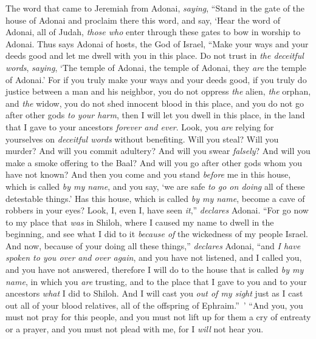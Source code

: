 \begin{biblechapter} %
 The word that came to Jeremiah from Adonai, \textit{saying},
\verse “Stand in the gate of the house of Adonai and proclaim there this word, and say, ‘Hear the word of Adonai, all of Judah, \textit{those who} enter through these gates to bow in worship to Adonai.
\verse Thus says Adonai of hosts, the God of Israel, “Make your ways and your deeds good and let me dwell with you in this place.
\verse Do not trust in \textit{the deceitful words}, \textit{saying}, ‘The temple of Adonai, the temple of Adonai, they \textit{are} the temple of Adonai.’
\verse For if you truly make your ways and your deeds good, if you truly do justice between a man and his neighbor,
\verse you do not oppress \textit{the} alien, \textit{the} orphan, and \textit{the} widow, you do not shed innocent blood in this place, and you do not go after other gods \textit{to your harm},
\verse then I will let you dwell in this place, in the land that I gave to your ancestors \textit{forever and ever}.
\verse Look, you \textit{are} relying for yourselves on \textit{deceitful words} without benefiting.
\verse Will you steal? Will you murder? And will you commit adultery? And will you swear \textit{falsely}? And will you make a smoke offering to the Baal? And will you go after other gods whom you have not known?
\verse And then you come and you stand \textit{before} me in this house, which is called \textit{by my name}, and you say, ‘we are safe \textit{to go on doing} all of these detestable things.’
\verse Has this house, which is called \textit{by my name}, become a cave of robbers in your eyes? Look, I, even I, have seen \textit{it},”  \textit{declares} Adonai.
\verse “For go now to my place that \textit{was} in Shiloh, where I caused my name to dwell in the beginning, and see what I did to it \textit{because of} the wickedness of my people Israel.
\verse And now, because of your doing all these things,” \textit{declares} Adonai, “and \textit{I have spoken to you over and over again}, and you have not listened, and I called you, and you have not answered,
\verse therefore I will do to the house that is called \textit{by my name}, in which you \textit{are} trusting, and to the place that I gave to you and to your ancestors \textit{what} I did to Shiloh.
\verse And I will cast you \textit{out of my sight} just as I cast out all of your blood relatives, all of the offspring of Ephraim.” ’
\verse “And you, you must not pray for this people, and you must not lift up for them a cry of entreaty or a prayer, and you must not plead with me, for I \textit{will} not hear you.

\end{biblechapter}

